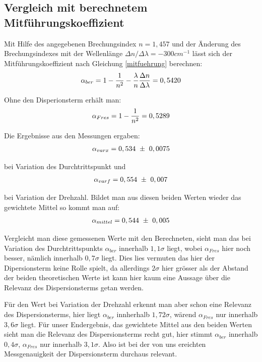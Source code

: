 \documentclass[12pt]{article}
\begin{document}
\subsection{Vergleich mit berechnetem Mitführungskoeffizient}
Mit Hilfe des angegebenen Brechungsindex $n=1,457$ und der Änderung des Brechungsindexes mit der Wellenlänge $\Delta n / \Delta\lambda = -300 cm^{-1}$
lässt sich der Mitführungskoeffizient nach Gleichung \ref{mitfuehrung} berechnen:
\begin{align}
\notag
 \alpha_{ber} = 1 - \frac{1}{n^2} - \frac{\lambda}{n} \frac{\Delta n}{\Delta \lambda} = 0,5420
\end{align}

Ohne den Disperionsterm erhält man:
\begin{align}
\notag
 \alpha_{Fres} = 1 - \frac{1}{n^2} = 0,5289
\end{align}

Die Ergebnisse aus den Messungen ergaben:
\begin{align}
\notag
 \alpha_{varx} = 0,534 \ \pm \ 0,0075
\end{align}

bei Variation des Durchtrittspunkt und
\begin{align}
\notag
 \alpha_{varf} = 0,554 \ \pm \ 0,007
\end{align}

bei Variation der Drehzahl. Bildet man aus diesen beiden Werten wieder das gewichtete Mittel so kommt man auf:
\begin{align}
\notag
 \alpha_{mittel} = 0,544 \ \pm \ 0,005
\end{align}

Vergleicht man diese gemessenen Werte mit den Berechneten, sieht man das bei Variation des Durch\-trittspunkts $\alpha_{ber}$ innerhalb $1,1\sigma$ liegt, wobei  $\alpha_{Fres}$ hier noch besser, nämlich innerhalb $0,7\sigma$ liegt. Dies lies vermuten das hier der Dipersionsterm keine Rolle spielt, da allerdings $2\sigma$ hier grösser als der Abstand der beiden theoretischen Werte ist kann hier kaum eine Aussage über die Relevanz des Dispersionsterms getan werden.

Für den Wert bei Variation der Drehzahl erkennt man aber schon eine Relevanz des Dispersionsterms, hier liegt $\alpha_{ber}$ innherhalb $1,72\sigma$, wärend $\alpha_{Fres}$ nur innerhalb $3,6\sigma$ liegt. Für unser Endergebnis, das gewichtete Mittel aus den beiden Werten sieht man die Relevanz des Dispersionsterms recht gut, hier stimmt $\alpha_{ber}$ innerhalb $0,4\sigma$, $\alpha_{Fres}$ nur innerhalb $3,1\sigma$. Also ist bei der von uns ereichten Messgenauigkeit der Dispersionsterm durchaus relevant.
\end{document}
